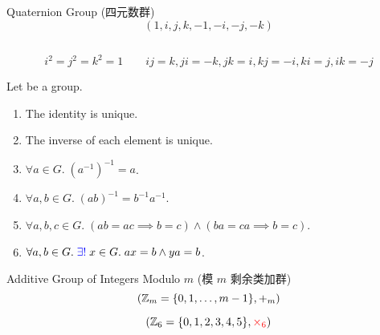 \begin{frame}
  \begin{exampleblock}{Quaternion Group (四元数群)}
    \[
      (1, i, j, k, -1, -i, -j, -k)
    \]
    \begin{columns}
        \begin{center}
        \end{center}
    \end{columns}
    \[
      i^2 = j^2 = k^2 = 1 \qquad ij = k, ji = -k, jk = i, kj = -i, ki = j, ik = -j
    \]
  \end{exampleblock}
\end{frame}

\begin{frame}
  \begin{theorem}
    Let  be a group.
    \begin{enumerate}[<+->][(1)]
      \setlength{\itemsep}{8pt}
      \item The identity is unique.
      \item The inverse of each element is unique.
      \item $\forall a \in G.\; (a^{-1})^{-1} = a$.
      \item $\forall a, b \in G.\; (ab)^{-1} = b^{-1}a^{-1}$.
      \item $\forall a, b, c \in G.\; (ab = ac \implies b = c) \land (ba = ca \implies b = c)$.
      \item $\forall a, b \in G.\; \textcolor{blue}{\exists!}\; x \in G.\; ax = b \land ya = b$.
    \end{enumerate}
  \end{theorem}
\end{frame}

\begin{frame}
  \begin{exampleblock}{Additive Group of Integers Modulo $m$ (模 $m$ 剩余类加群)}
    \[
      (\mathbb{Z}_{m} = \{0, 1, \dots, m-1\}, +_{m})
    \]
  \end{exampleblock}

  \pause
  \vspace{0.30cm}
  \[
    (\mathbb{Z}_{6} = \{0, 1, 2, 3, 4, 5\}, \textcolor{red}{\times_{6}})
  \]
\end{frame}

